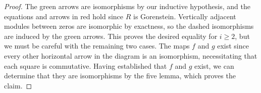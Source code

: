 \documentclass[11pt]{article}
\begin{document}
\begin{proof}
            The green arrows are isomorphisms by our inductive hypothesis, and the equations and arrows in red hold since \(R\) is Gorenstein. Vertically adjacent modules between zeros are isomorphic by exactness, so the dashed isomorphisms are induced by the green arrows. This proves the desired equality for \(i \geq 2\), but we must be careful with the remaining two cases. The maps \(f\) and \(g\) exist since every other horizontal arrow in the diagram is an isomorphism, necessitating that each square is commutative. Having established that \(f\) and \(g\) exist, we can determine that they are isomorphisms by the five lemma, which proves the claim. 
    \end{proof}

    \newpage
    \printbibliography[heading=none]
\end{document}
